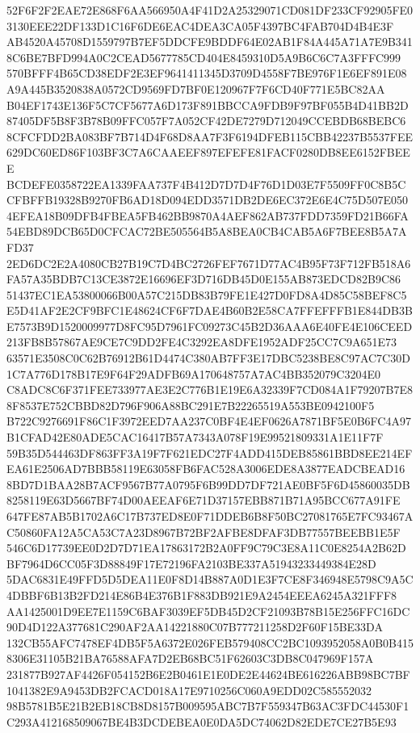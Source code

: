 \documentclass[UTF8,fontset=fandol,zihao=-4,a4paper]{ctexart}
\begin{document}
{{52F6F2F2EAE72E868F6AA566950A4F41D2A25329071CD081DF233CF92905FE03130EEE22DF133D1C16F6DE6EAC4DEA3CA05F4397BC4FAB704D4B4E3F
AB4520A45708D1559797B7EF5DDCFE9BDDF64E02AB1F84A445A71A7E9B3418C6BE7BFD994A0C2CEAD5677785CD404E8459310D5A9B6C6C7A3FFFC999
570BFFF4B65CD38EDF2E3EF9641411345D3709D4558F7BE976F1E6EF891E08A9A445B3520838A0572CD9569FD7BF0E120967F7F6CD40F771E5BC82AA
B04EF1743E136F5C7CF5677A6D173F891BBCCA9FDB9F97BF055B4D41BB2D87405DF5B8F3B78B09FFC057F7A052CF42DE7279D712049CCEBDB68BEBC6
8CFCFDD2BA083BF7B714D4F68D8AA7F3F6194DFEB115CBB42237B5537FEE629DC60ED86F103BF3C7A6CAAEEF897EFEFE81FACF0280DB8EE6152FBEEE
BCDEFE0358722EA1339FAA737F4B412D7D7D4F76D1D03E7F5509FF0C8B5CCFBFFB19328B9270FB6AD18D094EDD3571DB2DE6EC372E6E4C75D507E050
4EFEA18B09DFB4FBEA5FB462BB9870A4AEF862AB737FDD7359FD21B66FA54EBD89DCB65D0CFCAC72BE505564B5A8BEA0CB4CAB5A6F7BEE8B5A7AFD37
2ED6DC2E2A4080CB27B19C7D4BC2726FEF7671D77AC4B95F73F712FB518A6FA57A35BDB7C13CE3872E16696EF3D716DB45D0E155AB873EDCD82B9C86
51437EC1EA53800066B00A57C215DB83B79FE1E427D0FD8A4D85C58BEF8C5E5D41AF2E2CF9BFC1E48624CF6F7DAE4B60B2E58CA7FFEFFFB1E844DB3B
E7573B9D1520009977D8FC95D7961FC09273C45B2D36AAA6E40FE4E106CEED213FB8B57867AE9CE7C9DD2FE4C3292EA8DFE1952ADF25CC7C9A651E73
63571E3508C0C62B76912B61D4474C380AB7FF3E17DBC5238BE8C97AC7C30D1C7A776D178B17E9F64F29ADFB69A170648757A7AC4BB352079C3204E0
C8ADC8C6F371FEE733977AE3E2C776B1E19E6A32339F7CD084A1F79207B7E88F8537E752CBBD82D796F906A88BC291E7B22265519A553BE0942100F5
B722C9276691F86C1F3972EED7AA237C0BF4E4EF0626A7871BF5E0B6FC4A97B1CFAD42E80ADE5CAC16417B57A7343A078F19E99521809331A1E11F7F
59B35D544463DF863FF3A19F7F621EDC27F4ADD415DEB85861BBD8EE214EFEA61E2506AD7BBB58119E63058FB6FAC528A3006EDE8A3877EADCBEAD16
8BD7D1BAA28B7ACF9567B77A0795F6B99DD7DF721AE0BF5F6D45860035DB8258119E63D5667BF74D00AEEAF6E71D37157EBB871B71A95BCC677A91FE
647FE87AB5B1702A6C17B737ED8E0F71DDEB6B8F50BC27081765E7FC93467AC50860FA12A5CA53C7A23D8967B72BF2AFBE8DFAF3DB77557BEEBB1E5F
546C6D17739EE0D2D7D71EA17863172B2A0FF9C79C3E8A11C0E8254A2B62DBF7964D6CC05F3D88849F17E72196FA2103BE337A51943233449384E28D
5DAC6831E49FFD5D5DEA11E0F8D14B887A0D1E3F7CE8F346948E5798C9A5C4DBBF6B13B2FD214E86B4E376B1F883DB921E9A2454EEEA6245A321FFF8
AA1425001D9EE7E1159C6BAF3039EF5DB45D2CF21093B78B15E256FFC16DC90D4D122A377681C290AF2AA14221880C07B777211258D2F60F15BE33DA
132CB55AFC7478EF4DB5F5A6372E026FEB579408CC2BC1093952058A0B0B4158306E31105B21BA76588AFA7D2EB68BC51F62603C3DB8C047969F157A
231877B927AF4426F054152B6E2B0461E1E0DE2E44624BE616226ABB98BC7BF1041382E9A9453DB2FCACD018A17E9710256C060A9EDD02C585552032
98B5781B5E21B2EB18CB8D8157B009595ABC7B7F559347B63AC3FDC44530F1C293A412168509067BE4B3DCDEBEA0E0DA5DC74062D82EDE7CE27B5E93
}}
\end{document}
